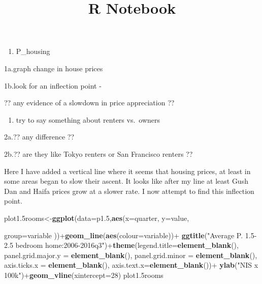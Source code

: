 \documentclass[]{article}
\title{R Notebook}
\author{}
\date{}
\newenvironment{Shaded}{\begin{snugshade}}{\end{snugshade}}
\newcommand{\KeywordTok}[1]{\textcolor[rgb]{0.13,0.29,0.53}{\textbf{{#1}}}}
\newcommand{\DataTypeTok}[1]{\textcolor[rgb]{0.13,0.29,0.53}{{#1}}}
\newcommand{\DecValTok}[1]{\textcolor[rgb]{0.00,0.00,0.81}{{#1}}}
\newcommand{\FloatTok}[1]{\textcolor[rgb]{0.00,0.00,0.81}{{#1}}}
\newcommand{\StringTok}[1]{\textcolor[rgb]{0.31,0.60,0.02}{{#1}}}
\newcommand{\NormalTok}[1]{{#1}}
\providecommand{\tightlist}{%
  \setlength{\itemsep}{0pt}\setlength{\parskip}{0pt}}
\begin{document}
\maketitle

\begin{enumerate}
\def\labelenumi{\arabic{enumi}.}
\tightlist
\item
  P\_housing
\end{enumerate}

1a.graph change in house prices

1b.look for an inflection point -

?? any evidence of a slowdown in price appreciation ??

\begin{enumerate}
\def\labelenumi{\arabic{enumi}.}
\setcounter{enumi}{1}
\tightlist
\item
  try to say something about renters vs.~owners
\end{enumerate}

2a.?? any difference ??

2b.?? are they like Tokyo renters or San Francisco renters ??

Here I have added a vertical line where it seems that housing prices, at
least in some areas began to slow their ascent. It looks like after my
line at least Gush Dan and Haifa prices grow at a slower rate. I now
attempt to find this inflection point.

\begin{Shaded}
\begin{Highlighting}[]
\NormalTok{plot1.5rooms<-}\KeywordTok{ggplot}\NormalTok{(}\DataTypeTok{data=}\NormalTok{p1}\FloatTok{.5}\NormalTok{,}\KeywordTok{aes}\NormalTok{(}\DataTypeTok{x=}\NormalTok{quarter,}
                     \DataTypeTok{y=}\NormalTok{value,}
                    
                     \DataTypeTok{group=}\NormalTok{variable}
                     \NormalTok{))+}\KeywordTok{geom_line}\NormalTok{(}\KeywordTok{aes}\NormalTok{(}\DataTypeTok{colour=}\NormalTok{variable))+}
\StringTok{                     }\KeywordTok{ggtitle}\NormalTok{(}\StringTok{"Average P. 1.5-2.5 bedroom home:2006-2016q3"}\NormalTok{)+}\KeywordTok{theme}\NormalTok{(}\DataTypeTok{legend.title=}\KeywordTok{element_blank}\NormalTok{(),}
                   \DataTypeTok{panel.grid.major.y =} \KeywordTok{element_blank}\NormalTok{(),}
                   \DataTypeTok{panel.grid.minor =} \KeywordTok{element_blank}\NormalTok{(),}
                   \DataTypeTok{axis.ticks.x =} \KeywordTok{element_blank}\NormalTok{(),}
                   \DataTypeTok{axis.text.x=}\KeywordTok{element_blank}\NormalTok{())+}\StringTok{ }\KeywordTok{ylab}\NormalTok{(}\StringTok{"NIS x 100k"}\NormalTok{)+}\KeywordTok{geom_vline}\NormalTok{(}\DataTypeTok{xintercept=}\DecValTok{28}\NormalTok{)}
\NormalTok{plot1.5rooms}
\end{Highlighting}
\end{Shaded}
\end{document}
